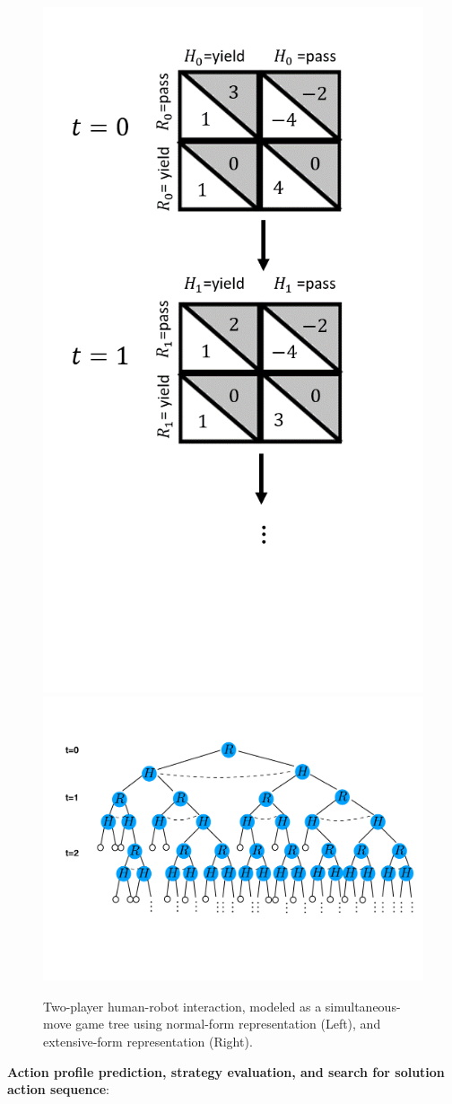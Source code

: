 \documentclass[letterpaper, 10 pt, conference]{ieeeconf}  %
\begin{document}
\begin{figure}[t]
	\centering
	\hspace{-1.7em}
	\includegraphics[width=0.3\columnwidth]{newGameTree}
	\vspace{-.75em}
	\hspace{-2em}
  \includegraphics[width=0.8\columnwidth]{game_tree}
	\vspace{-2.4em}
	\hspace{-1em}
	\caption{Two-player human-robot interaction, modeled as a simultaneous-move 
  game tree using normal-form representation (Left), and extensive-form 
  representation (Right). }
	\vspace{-1.4em}
	\label{fig:game_tree}
\end{figure}

\textbf{Action profile prediction, strategy evaluation, and search for 
solution action sequence}:
\end{document}

